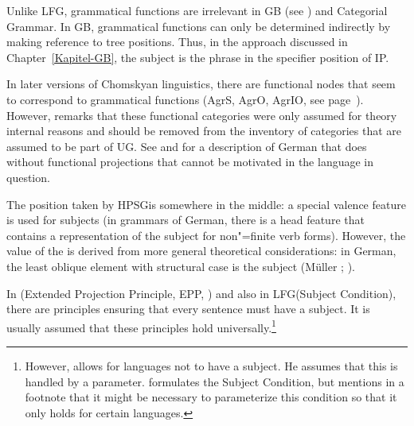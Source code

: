 Unlike LFG, grammatical functions are irrelevant in GB (see \citealp{Williams84a,Sternefeld85a}) and Categorial Grammar\indexcg. In GB, grammatical functions can only be
determined indirectly by making reference to tree positions. Thus, in the approach discussed in
Chapter~\ref{Kapitel-GB}, the subject is the phrase in the specifier position of IP.

In later versions of Chomskyan linguistics, there are functional nodes that seem to correspond to grammatical functions (AgrS,
AgrO, AgrIO, see
page~\pageref{Seite-AgrO}). However, \citet[Section~4.10.1]{Chomsky95a-u} remarks that these functional categories were only assumed for theory internal reasons
and should be removed from the inventory of categories that are assumed to be part of UG. See  and  for a description of German that does without functional projections
that cannot be motivated in the language in question.

The position taken by HPSG\indexhpsg is somewhere in the middle: a special valence feature is used for subjects (in grammars of German, there is a head feature that contains a
representation of the subject for non"=finite verb forms). However, the value of the \subjf is
derived from more general theoretical considerations: in German, the least oblique
element with structural case is the subject (Müller \citeyear[]{Mueller2002b}; \citeyear[]{MuellerLehrbuch1}).

In \gbt (Extended Projection Principle, EPP, ) and also in LFG\indexlfg (Subject Condition), there are principles
ensuring that every sentence must have a subject. It is usually assumed that these principles hold universally.\footnote{ 
  However, \citet[]{Chomsky81a} allows for languages not to have a subject. He assumes that this is handled by a parameter.
 \citet[]{Bresnan2001a} formulates the Subject Condition, but mentions in a footnote that it might be necessary
to parameterize this condition so that it only holds for certain languages.%
} 
  
